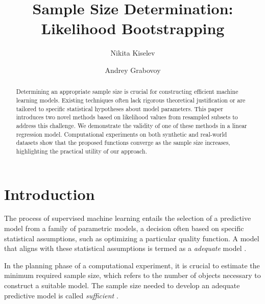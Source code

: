\documentclass[runningheads]{llncs}
\begin{document}
%
\title{Sample Size Determination:\\Likelihood Bootstrapping}
%
%
\author{Nikita Kiselev \and Andrey Grabovoy}
%
%
%
\maketitle %
%
\begin{abstract}

Determining an appropriate sample size is crucial for constructing efficient machine learning models. Existing techniques often lack rigorous theoretical justification or are tailored to specific statistical hypotheses about model parameters. This paper introduces two novel methods based on likelihood values from resampled subsets to address this challenge. We demonstrate the validity of one of these methods in a linear regression model. Computational experiments on both synthetic and real-world datasets show that the proposed functions converge as the sample size increases, highlighting the practical utility of our approach.

\end{abstract}
%
%
%
\section{Introduction}
The process of supervised machine learning entails the selection of a predictive model from a family of parametric models, a decision often based on specific statistical assumptions, such as optimizing a particular quality function. A model that aligns with these statistical assumptions is termed as a \textit{adequate} model \cite{bies2006genetic,cawley2010over}.

In the planning phase of a computational experiment, it is crucial to estimate the minimum required sample size, which refers to the number of objects necessary to construct a suitable model. The sample size needed to develop an adequate predictive model is called \textit{sufficient} \cite{byrd2012sample,figueroa2012predicting,balki2019sample}. 
\end{document}
